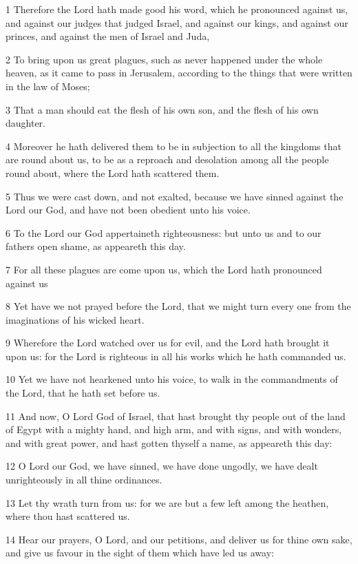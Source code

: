 \par 1 Therefore the Lord hath made good his word, which he pronounced against us, and against our judges that judged Israel, and against our kings, and against our princes, and against the men of Israel and Juda,
\par 2 To bring upon us great plagues, such as never happened under the whole heaven, as it came to pass in Jerusalem, according to the things that were written in the law of Moses;
\par 3 That a man should eat the flesh of his own son, and the flesh of his own daughter.
\par 4 Moreover he hath delivered them to be in subjection to all the kingdoms that are round about us, to be as a reproach and desolation among all the people round about, where the Lord hath scattered them.
\par 5 Thus we were cast down, and not exalted, because we have sinned against the Lord our God, and have not been obedient unto his voice.
\par 6 To the Lord our God appertaineth righteousness: but unto us and to our fathers open shame, as appeareth this day.
\par 7 For all these plagues are come upon us, which the Lord hath pronounced against us
\par 8 Yet have we not prayed before the Lord, that we might turn every one from the imaginations of his wicked heart.
\par 9 Wherefore the Lord watched over us for evil, and the Lord hath brought it upon us: for the Lord is righteous in all his works which he hath commanded us.
\par 10 Yet we have not hearkened unto his voice, to walk in the commandments of the Lord, that he hath set before us.
\par 11 And now, O Lord God of Israel, that hast brought thy people out of the land of Egypt with a mighty hand, and high arm, and with signs, and with wonders, and with great power, and hast gotten thyself a name, as appeareth this day:
\par 12 O Lord our God, we have sinned, we have done ungodly, we have dealt unrighteously in all thine ordinances.
\par 13 Let thy wrath turn from us: for we are but a few left among the heathen, where thou hast scattered us.
\par 14 Hear our prayers, O Lord, and our petitions, and deliver us for thine own sake, and give us favour in the sight of them which have led us away:
